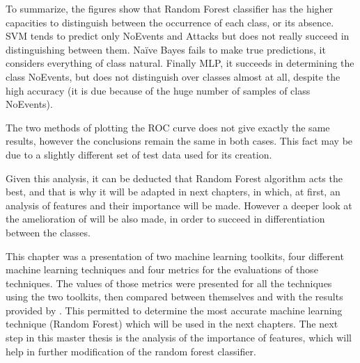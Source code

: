 To summarize, the figures show that Random Forest classifier has the higher capacities to distinguish between the occurrence of each class, or its absence. SVM tends to predict only NoEvents and Attacks but does not really succeed in distinguishing between them. Naïve Bayes fails to make true predictions, it considers everything of class natural. Finally MLP, it succeeds in determining the class NoEvents, but does not distinguish over classes almost at all, despite the high accuracy (it is due because of the huge number of samples of class NoEvents).

The two methods of plotting the ROC curve does not give exactly the same results, however the conclusions remain the same in both cases. This fact may be due to a slightly different set of test data used for its creation.

Given this analysis, it can be deducted that Random Forest algorithm acts the best, and that is why it will be adapted in next chapters, in which, at first, an analysis of features and their importance will be made. However a deeper look at the amelioration of  will be also made, in order to succeed in differentiation between the classes.

\FloatBarrier

This chapter was a presentation of two machine learning toolkits, four different machine learning techniques and four metrics for the evaluations of those techniques. The values of those metrics were presented for all the techniques using the two toolkits, then compared between themselves and with the results provided by \cite{borges_hink_machine_2014-1}. This permitted to determine the most accurate machine learning technique (Random Forest) which will be used in the next chapters. The next step in this master thesis is the analysis of the importance of features, which will help in further modification of the random forest classifier. 

